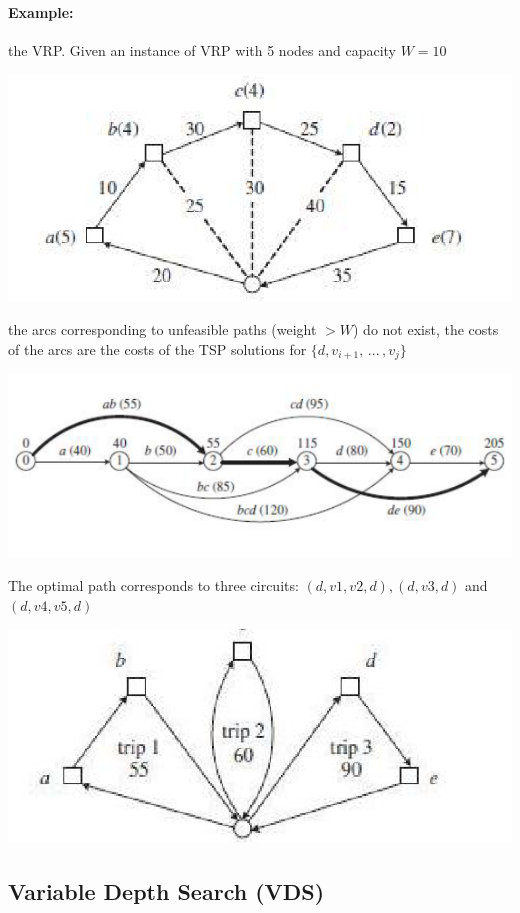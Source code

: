 \documentclass[11pt]{article}
\begin{document}
	\paragraph{Example:} the VRP. Given an instance of VRP with 5 nodes and capacity $W = 10$
	\begin{center}
		\includegraphics[width=0.6\columnwidth]{img/VRP2}
	\end{center}
	the arcs corresponding to unfeasible paths (weight $> W$) do not exist, the costs of the arcs are the costs of the TSP solutions for $\{d, v_{i+1}, \, ... \, , v_j \}$
	\begin{center}
		\includegraphics[width=0.6\columnwidth]{img/VRP3}
	\end{center}
	The optimal path corresponds to three circuits: $(d, v1, v2, d), (d, v3, d)$ and $(d, v4, v5, d)$
	\begin{center}
		\includegraphics[width=0.6\columnwidth]{img/VRP4}
	\end{center}
	
	\newpage
	
	\subsection{Variable Depth Search (VDS)}
	
\end{document}
